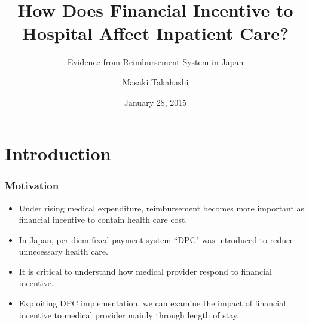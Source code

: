 \documentclass[14pt]{beamer}
\title[Master's Thesis]{How Does Financial Incentive to Hospital Affect Inpatient Care?}
\subtitle{Evidence from Reimbursement System in Japan}
\author[Masaki Takahashi]{Masaki Takahashi}
\institute[Univ. of Tokyo]{Graduate School of Economics, University of Tokyo}
\date{January 28, 2015}
\begin{document}
\frame{\titlepage}

\frame{\tableofcontents}

\section{Introduction}

\begin{frame}[allowframebreaks]
\frametitle{Motivation}
\begin{itemize}
\item Under rising medical expenditure, reimbursement becomes more important as financial incentive to contain health care cost.
\item In Japan, per-diem fixed payment system ``DPC" was introduced to reduce unnecessary health care.
\item It is critical to understand how medical provider respond to financial incentive.

\item Exploiting DPC implementation, we can examine the impact of financial incentive to medical provider mainly through length of stay.
\end{itemize}

\framebreak
 

\end{frame}
\end{document}
